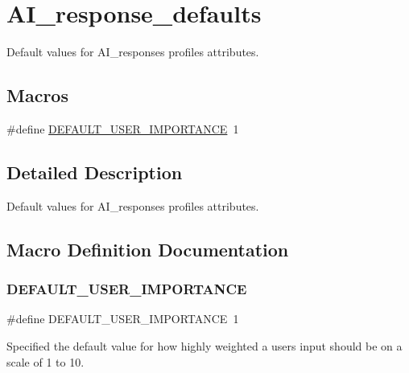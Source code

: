 \hypertarget{group__AI__response__defaults}{}\section{A\+I\+\_\+response\+\_\+defaults}
\label{group__AI__response__defaults}


Default values for A\+I\+\_\+response\textquotesingle{}s profile\textquotesingle{}s attributes.  


\subsection*{Macros}
\begin{DoxyCompactItemize}
\item 
\#define \hyperlink{group__AI__response__defaults_gaf8a3f5ff4c2119a538c675cfb52952a7}{D\+E\+F\+A\+U\+L\+T\+\_\+\+U\+S\+E\+R\+\_\+\+I\+M\+P\+O\+R\+T\+A\+N\+CE}~1
\end{DoxyCompactItemize}


\subsection{Detailed Description}
Default values for A\+I\+\_\+response\textquotesingle{}s profile\textquotesingle{}s attributes. 



\subsection{Macro Definition Documentation}
\mbox{\label{group__AI__response__defaults_gaf8a3f5ff4c2119a538c675cfb52952a7}} 
\subsubsection{\texorpdfstring{D\+E\+F\+A\+U\+L\+T\+\_\+\+U\+S\+E\+R\+\_\+\+I\+M\+P\+O\+R\+T\+A\+N\+CE}{DEFAULT\_USER\_IMPORTANCE}}
{\footnotesize\ttfamily \#define D\+E\+F\+A\+U\+L\+T\+\_\+\+U\+S\+E\+R\+\_\+\+I\+M\+P\+O\+R\+T\+A\+N\+CE~1}

Specified the default value for how highly weighted a user\textquotesingle{}s input should be on a scale of 1 to 10. 
